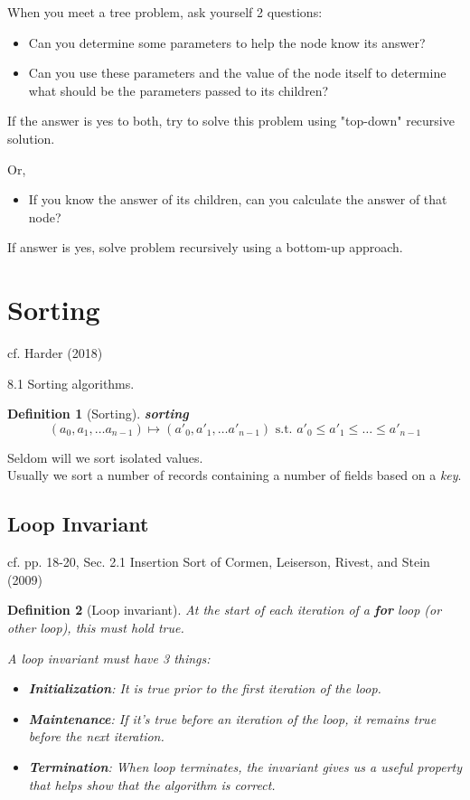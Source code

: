 \documentclass[10pt]{amsart}
\newtheorem{definition}{Definition}
\begin{document}
\begin{multicols*}{2}
When you meet a tree problem, ask yourself 2 questions: 
\begin{itemize}
	\item Can you determine some parameters to help the node know its answer?
	\item Can you use these parameters and the value of the node itself to determine what should be the parameters passed to its children?
\end{itemize}
If the answer is yes to both, try to solve this problem using "top-down" recursive solution.

Or,
\begin{itemize}
	\item If you know the answer of its children, can you calculate the answer of that node?
\end{itemize}
If answer is yes, solve problem recursively using a bottom-up approach.


\section{Sorting}

cf. Harder (2018) \cite{Hard2018}

8.1 Sorting algorithms. 

\begin{definition}[Sorting]
	\textbf{sorting}
	\begin{equation}
	(a_0, a_1, \dots a_{n-1}) \mapsto (a'_0, a'_1, \dots a'_{n-1}) \text{ s.t. } a'_0 \leq a'_1 \leq \dots \leq a'_{n-1}
	\end{equation}
\end{definition}
Seldom will we sort isolated values. \\
Usually we sort a number of records containing a number of fields based on a \emph{key}. \\


\subsection{Loop Invariant}

cf. pp. 18-20, Sec. 2.1 Insertion Sort of Cormen, Leiserson, Rivest, and Stein (2009) \cite{CLRS2009}

\begin{definition}[Loop invariant]
	At the start of each iteration of a \textbf{for} loop (or other loop), this must hold true.
	
	A loop invariant must have 3 things:
	\begin{itemize}
		\item \textbf{Initialization}: It is true prior to the first iteration of the loop.
		\item \textbf{Maintenance}: If it's true before an iteration of the loop, it remains true before the next iteration.
		\item \textbf{Termination}: When loop terminates, the invariant gives us a useful property that helps show that the algorithm is correct.
	\end{itemize}
\end{definition}


\end{multicols*}
\end{document}
